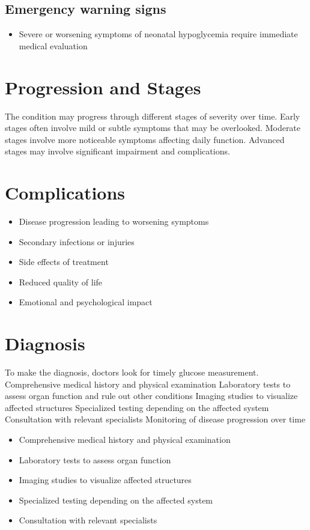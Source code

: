 \subsection{Emergency warning signs}
\begin{itemize}[noitemsep]
  \item Severe or worsening symptoms of neonatal hypoglycemia require immediate medical evaluation
\end{itemize}
\section{Progression and Stages}
The condition may progress through different stages of severity over time. Early stages often involve mild or subtle symptoms that may be overlooked. Moderate stages involve more noticeable symptoms affecting daily function. Advanced stages may involve significant impairment and complications.
\section{Complications}
\begin{itemize}[noitemsep]
  \item Disease progression leading to worsening symptoms
  \item Secondary infections or injuries
  \item Side effects of treatment
  \item Reduced quality of life
  \item Emotional and psychological impact
\end{itemize}
\section{Diagnosis}
To make the diagnosis, doctors look for timely glucose measurement. Comprehensive medical history and physical examination Laboratory tests to assess organ function and rule out other conditions Imaging studies to visualize affected structures Specialized testing depending on the affected system Consultation with relevant specialists Monitoring of disease progression over time

\begin{itemize}[noitemsep]
  \item Comprehensive medical history and physical examination
  \item Laboratory tests to assess organ function
  \item Imaging studies to visualize affected structures
  \item Specialized testing depending on the affected system
  \item Consultation with relevant specialists
\end{itemize}
